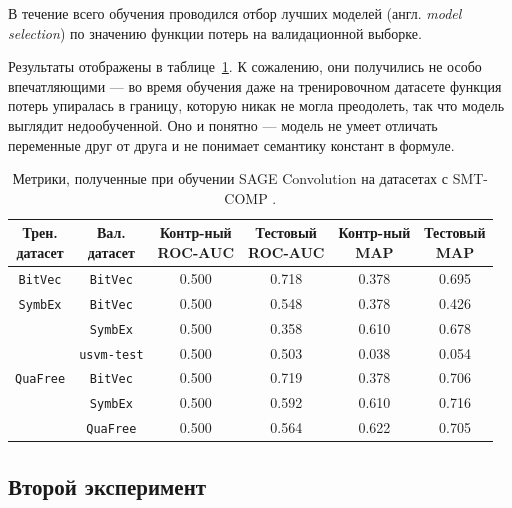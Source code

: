 В течение всего обучения проводился отбор лучших моделей (англ. \textit{model selection}) по значению функции потерь на валидационной выборке.

Результаты отображены в таблице~\ref{smt-comp-val-results}. К сожалению, они получились не особо впечатляющими --- во время обучения даже на тренировочном датасете функция потерь упиралась в границу, которую никак не могла преодолеть, так что модель выглядит недообученной. Оно и понятно --- модель не умеет отличать переменные друг от друга и не понимает семантику констант в формуле.

\begin{table}[ht]
\begin{center}
\begin{tabular}{c|c||cc|cc}
    \makecell{Трен. \\ датасет} & \makecell{Вал. \\ датасет} & \makecell{Контр-ный \\ \textsc{ROC-AUC}} & \makecell{Тестовый \\ \textsc{ROC-AUC}} & \makecell{Контр-ный \\ \textsc{MAP}} & \makecell{Тестовый \\ \textsc{MAP}} \\
    \hline \hline
    \rule{0pt}{2.5ex}
    \texttt{BitVec}  & \texttt{BitVec}     & 0.500 & 0.718 & 0.378 & 0.695 \\
    \hline
    \texttt{SymbEx}  & \texttt{BitVec}     & 0.500 & 0.548 & 0.378 & 0.426 \\
                     & \texttt{SymbEx}     & 0.500 & 0.358 & 0.610 & 0.678 \\
                     & \texttt{usvm-test}  & 0.500 & 0.503 & 0.038 & 0.054 \\
    \hline
    \texttt{QuaFree} & \texttt{BitVec}     & 0.500 & 0.719 & 0.378 & 0.706 \\
                     & \texttt{SymbEx}     & 0.500 & 0.592 & 0.610 & 0.716 \\
                     & \texttt{QuaFree}    & 0.500 & 0.564 & 0.622 & 0.705 \\
\end{tabular}
\caption{\label{smt-comp-val-results} Метрики, полученные при обучении SAGE Convolution на датасетах с SMT-COMP \cite{smt-comp-2023-benchmarks}.}
\end{center}
\end{table}

\subsection{Второй эксперимент}


